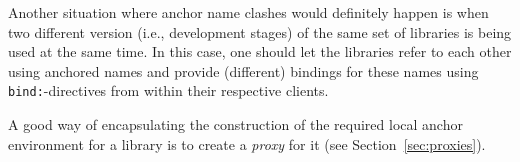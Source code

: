 Another situation where anchor name clashes would definitely happen is
when two different version (i.e., development stages) of the same set
of libraries is being used at the same time.  In this case, one should
let the libraries refer to each other using anchored names and provide
(different) bindings for these names using {\tt bind:}-directives from
within their respective clients.

A good way of encapsulating the construction of the required local
anchor environment for a library is to create a {\em proxy} for it
(see Section~\ref{sec:proxies}).
